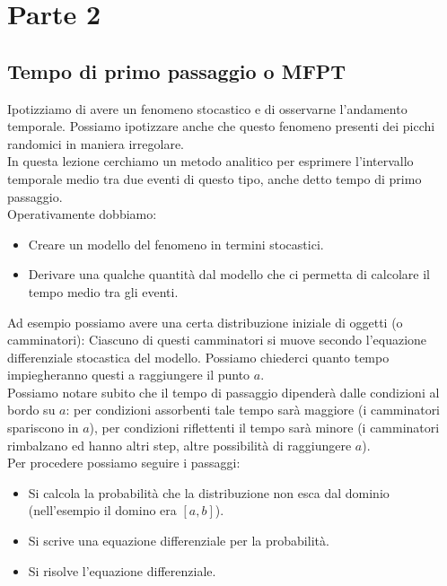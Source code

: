 \section*{Parte 2}%
\label{sub:Parte 2}
\subsection{Tempo di primo passaggio o MFPT}%
\label{sub:Tempo di primo passaggio o MFPT}
Ipotizziamo di avere un fenomeno stocastico e di osservarne l'andamento temporale. Possiamo ipotizzare anche che questo fenomeno presenti dei picchi randomici in maniera irregolare. \\
In questa lezione cerchiamo un metodo analitico per esprimere l'intervallo temporale medio tra due eventi di questo tipo, anche detto tempo di primo passaggio.\\
Operativamente dobbiamo:
\begin{itemize}
    \item Creare un modello del fenomeno in termini stocastici.
    \item Derivare una qualche quantità dal modello che ci permetta di calcolare il tempo medio tra gli eventi.
\end{itemize}
Ad esempio possiamo avere una certa distribuzione iniziale di oggetti (o camminatori):
%
\noindent
Ciascuno di questi camminatori si muove secondo l'equazione differenziale stocastica del modello. Possiamo chiederci quanto tempo impiegheranno questi a raggiungere il punto $a$. \\
Possiamo notare subito che il tempo di passaggio dipenderà dalle condizioni al bordo su $a$: per condizioni assorbenti tale tempo sarà maggiore (i camminatori spariscono in $a$), per condizioni riflettenti il tempo sarà minore (i camminatori rimbalzano ed hanno altri step, altre possibilità di raggiungere $a$).\\
Per procedere possiamo seguire i passaggi:
\begin{itemize}
    \item Si calcola la probabilità che la distribuzione non esca dal dominio (nell'esempio il domino era $[a,b]$).
    \item Si scrive una equazione differenziale per la probabilità.
    \item Si risolve l'equazione differenziale.
\end{itemize}
